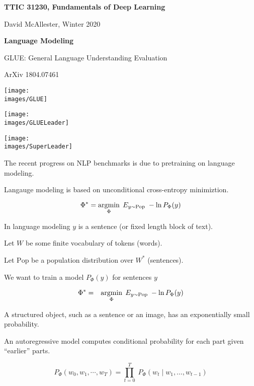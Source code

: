 




{\Huge

  \centerline{\bf TTIC 31230, Fundamentals of Deep Learning}
  \bigskip
  \centerline{David McAllester, Winter 2020}
  \vfill
  \centerline{\bf Language Modeling}


GLUE: General Language Understanding Evaluation

\vfill

\centerline{\normalsize ArXiv 1804.07461}
\centerline{\texttt{[image: \\images/GLUE]}}


\centerline{\texttt{[image: \\images/GLUELeader]}}


\centerline{\texttt{[image: \\images/SuperLeader]}}


The recent progress on NLP benchmarks is due to pretraining on language modeling.

\vfill
Langauge modeling is based on unconditional cross-entropy minimiztion.

\vfill
$$\Phi^* = \operatorname*{argmin}_\Phi \;E_{y \sim \mathrm{Pop}}\;-\ln P_\Phi(y)$$

\vfill
In language modeling $y$ is a sentence (or fixed length block of text).


Let $W$ be some finite vocabulary of tokens (words).

\vfill
Let $\mathrm{Pop}$ be a population distribution over $W^*$ (sentences).

\vfill
We want to train a model $P_\Phi(y)$ for sentences $y$

\begin{eqnarray*}
\Phi^* & = & \operatorname*{argmin}_\Phi \; E_{y \sim \mathrm{Pop}}\;-\ln P_\Phi(y)
\end{eqnarray*}


A structured object, such as a sentence or an image, has an exponentially small probability.

\vfill
An autoregressive model computes conditional probability for each part given ``earlier'' parts.

\vfill
$$P_\Phi(w_0, w_1, \cdots, w_T) = \prod_{t=0}^T\;P_\Phi(w_t\;|\;w_1,\ldots,w_{t-1})$$


}
